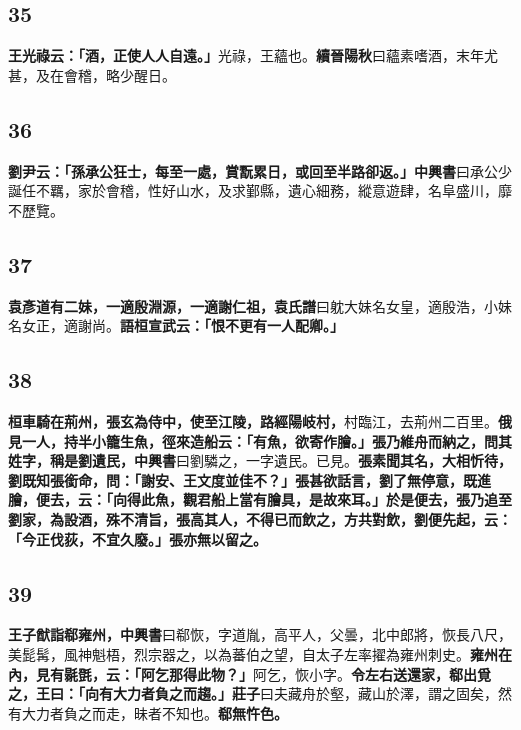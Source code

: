 \subsection*{35}

\textbf{王光祿云：「酒，正使人人自遠。」}{\footnotesize 光祿，王蘊也。\textbf{續晉陽秋}曰蘊素嗜酒，末年尤甚，及在會稽，略少醒日。}

\subsection*{36}

\textbf{劉尹云：「孫承公狂士，每至一處，賞翫累日，或回至半路卻返。」}{\footnotesize \textbf{中興書}曰承公少誕任不羈，家於會稽，性好山水，及求鄞縣，遺心細務，縱意遊肆，名阜盛川，靡不歷覽。}

\subsection*{37}

\textbf{袁彥道有二妹，一適殷淵源，一適謝仁祖，}{\footnotesize \textbf{袁氏譜}曰躭大妹名女皇，適殷浩，小妹名女正，適謝尚。}\textbf{語桓宣武云：「恨不更有一人配卿。」}

\subsection*{38}

\textbf{桓車騎在荊州，張玄為侍中，使至江陵，路經陽岐村，}{\footnotesize 村臨江，去荊州二百里。}\textbf{俄見一人，持半小籠生魚，徑來造船云：「有魚，欲寄作膾。」張乃維舟而納之，問其姓字，稱是劉遺民，}{\footnotesize \textbf{中興書}曰劉驎之，一字遺民。已見。}\textbf{張素聞其名，大相忻待，劉既知張銜命，問：「謝安、王文度並佳不？」張甚欲話言，劉了無停意，既進膾，便去，云：「向得此魚，觀君船上當有膾具，是故來耳。」於是便去，張乃追至劉家，為設酒，殊不清旨，張高其人，不得已而飲之，方共對飲，劉便先起，云：「今正伐荻，不宜久廢。」張亦無以留之。}

\subsection*{39}

\textbf{王子猷詣郗雍州，}{\footnotesize \textbf{中興書}曰郗恢，字道胤，高平人，父曇，北中郎將，恢長八尺，美髭髯，風神魁梧，烈宗器之，以為蕃伯之望，自太子左率擢為雍州刺史。}\textbf{雍州在內，見有毾㲪，云：「阿乞那得此物？」}{\footnotesize 阿乞，恢小字。}\textbf{令左右送還家，郗出覓之，王曰：「向有大力者負之而趨。」}{\footnotesize \textbf{莊子}曰夫藏舟於壑，藏山於澤，謂之固矣，然有大力者負之而走，昧者不知也。}\textbf{郗無忤色。}

